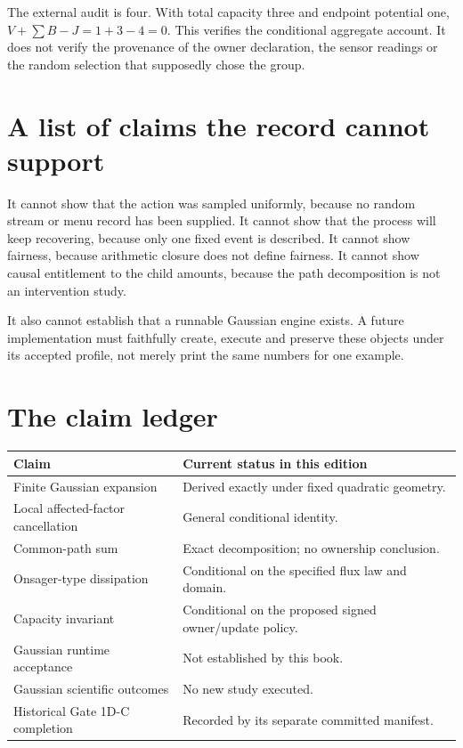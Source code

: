 The external audit is four. With total capacity three and endpoint potential
one, $V+\sum B-J=1+3-4=0$. This verifies the conditional aggregate
account. It does not verify the provenance of the owner declaration, the
sensor readings or the random selection that supposedly chose the group.

\section{A list of claims the record cannot support}
It cannot show that the action was sampled uniformly, because no random
stream or menu record has been supplied. It cannot show that the process
will keep recovering, because only one fixed event is described. It cannot
show fairness, because arithmetic closure does not define fairness. It
cannot show causal entitlement to the child amounts, because the path
decomposition is not an intervention study.

It also cannot establish that a runnable Gaussian engine exists. A future
implementation must faithfully create, execute and preserve these objects
under its accepted profile, not merely print the same numbers for one example.

\section{The claim ledger}
\begin{center}
\begin{tabular}{P{.41\linewidth}P{.46\linewidth}}
\toprule Claim & Current status in this edition\\\midrule
Finite Gaussian expansion & Derived exactly under fixed quadratic geometry.\\
Local affected-factor cancellation & General conditional identity.\\
Common-path sum & Exact decomposition; no ownership conclusion.\\
Onsager-type dissipation & Conditional on the specified flux law and domain.\\
Capacity invariant & Conditional on the proposed signed owner/update policy.\\
Gaussian runtime acceptance & Not established by this book.\\
Gaussian scientific outcomes & No new study executed.\\
Historical Gate 1D-C completion & Recorded by its separate committed manifest.\\
\bottomrule
\end{tabular}
\end{center}

